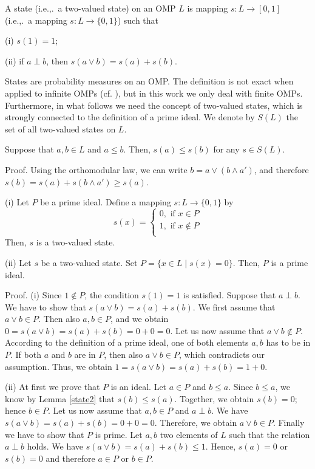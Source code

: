 \begin{defin}
\label{state}
A state (i.e.,.~a two-valued state) on an OMP $L$ is mapping
$s:L \rightarrow [0,1]$ (i.e.,.~a mapping $s:L \rightarrow \{0,1\}$)
such that

(i) $s(1) = 1$;

(ii) if $a \perp b$, then $s(a \vee b) = s(a) + s(b)$.
\end{defin}

States are probability measures on an OMP.
The definition is not exact when applied to infinite OMPs (cf.
\cite{ptak}), but in this work we only deal with finite OMPs.
Furthermore, in what follows we need the concept of two-valued states,
which is strongly connected to the definition of a prime ideal.
We denote by $S(L)$ the set of all two-valued states on $L$.

\begin{lemma}
\label{state2}
Suppose that $a,b \in L$ and $a \le b$.
Then, $s(a) \le s(b)$ for any $s \in S(L)$.
\end{lemma}

Proof.
Using the orthomodular law, we can write $b = a \vee (b \wedge a')$,
and therefore
$s(b) = s(a) + s(b \wedge a') \ge s(a)$.

\begin{lemma}
\label{state3}
(i) Let $P$ be a prime ideal. Define a mapping $s:L \rightarrow \{0,1\}$ by
\[ s(x) = \left\{
\begin{array}{l}
0, \mbox{ if } x \in P \\
1, \mbox { if } x \not\in P \\
\end{array}
\right. \]
Then, $s$ is a two-valued state.

(ii) Let $s$ be a two-valued state.
Set $P = \{ x \in L\mid s(x) = 0\}$.
Then, $P$ is a prime ideal.
\end{lemma}

Proof.
(i) Since $1 \not\in P$, the condition $s(1) = 1$ is satisfied.
Suppose that $a \perp b$.
We have to show that $s(a \vee b) = s(a) + s(b)$.
We first assume that $a \vee b \in P$.
Then also $a,b \in P$, and we obtain
$0 = s(a \vee b) = s(a) + s(b) = 0 + 0 = 0$.
Let us now assume that $a \vee b \not\in P$.
According to the definition of a prime ideal, one of both elements $a,b$
has to be in $P$.
If both $a$ and $b$ are in $P$, then also $a \vee b \in P$,
which contradicts our assumption.
Thus, we obtain $1 = s(a \vee b) = s(a) + s(b) = 1 + 0$.

(ii) At first we prove that $P$ is an ideal.
Let $a \in P$ and $b \le a$.
Since $b \le a$, we know by Lemma \ref{state2} that $s(b) \le s(a)$.
Together, we obtain $s(b) = 0$; hence $b \in P$.
Let us now assume that $a,b \in P$ and $a \perp b$.
We have $s(a \vee b) = s(a) + s(b) = 0 + 0 = 0$.
Therefore, we obtain $a \vee b \in P$.
Finally we have to show that $P$ is prime.
Let $a,b$ two elements of $L$ such that the relation $a \perp b$ holds.
We have $s(a \vee b) = s(a) + s(b) \le 1$.
Hence, $s(a) = 0$ or $s(b) = 0$ and therefore
$a \in P$ or $b \in P$. \\

